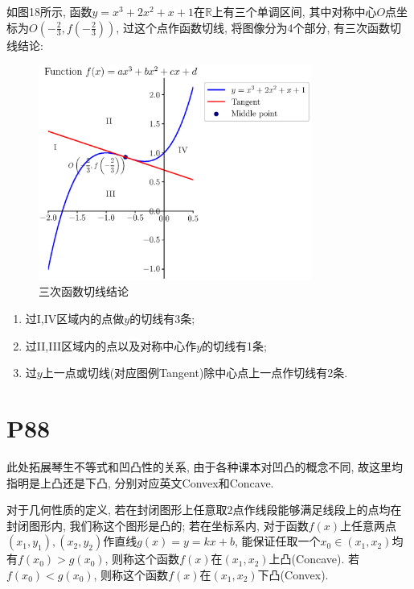 \documentclass{book}
\begin{document}
    如图18所示, 函数$y=x^3+2x^2+x+1$在$\mathbb{R}$上有三个单调区间, 其中对称中心$O$点坐标为$\displaystyle O\left ( -\frac{2}{3},f\left ( -\frac{2}{3} \right )  \right ) $, 过这个点作函数切线, 将图像分为4个部分, 有三次函数切线结论:

    \begin{figure}[htbp]
        \centering
        \includegraphics[width=0.8\textwidth]{img/CubicFunction.eps}
        \caption{三次函数切线结论}
    \end{figure}

    \begin{enumerate}
        \item 过I,IV区域内的点做$y$的切线有3条;
        \item 过II,III区域内的点以及对称中心作$y$的切线有1条;
        \item 过$y$上一点或切线(对应图例Tangent)除中心点上一点作切线有2条.
    \end{enumerate}

    \section{\textcolor[rgb]{0.11,0.65,0.52}{P88}}

    此处拓展\textcolor[rgb]{0.38,0.11,0.2}{琴生不等式}和\textcolor[rgb]{0.38,0.11,0.2}{凹凸性}的关系, 由于各种课本对凹凸的概念不同, 故这里均指明是上凸还是下凸, 分别对应英文Convex和Concave.

    对于几何性质的定义, 若在封闭图形上任意取2点作线段能够满足线段上的点均在封闭图形内, 我们称这个图形是凸的; 若在坐标系内, 对于函数$f(x)$上任意两点$(x_1,y_1),(x_2,y_2)$作直线$g(x)=y=kx+b$, 能保证任取一个$x_0\in \left( x_1,x_2 \right)$均有$f(x_0)>g(x_0)$, 则称这个函数$f(x)$在$\left( x_1,x_2 \right)$上凸(Concave). 若$f(x_0)<g(x_0)$, 则称这个函数$f(x)$在$\left( x_1,x_2 \right)$下凸(Convex).
\end{document}
